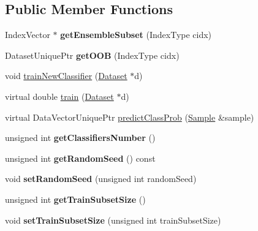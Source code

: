 \subsection*{Public Member Functions}
\begin{DoxyCompactItemize}
\item 
\hypertarget{classffactory_1_1_bagging_classifier_ac8efae7493fe5fa73188c3104100faa7}{Index\-Vector $\ast$ {\bfseries get\-Ensemble\-Subset} (Index\-Type cidx)}\label{classffactory_1_1_bagging_classifier_ac8efae7493fe5fa73188c3104100faa7}

\item 
\hypertarget{classffactory_1_1_bagging_classifier_ac237abc196fba89c3e84b608957533dc}{Dataset\-Unique\-Ptr {\bfseries get\-O\-O\-B} (Index\-Type cidx)}\label{classffactory_1_1_bagging_classifier_ac237abc196fba89c3e84b608957533dc}

\item 
void \hyperlink{classffactory_1_1_bagging_classifier_ad5a99acbc8c7760ee7757317981b3c50}{train\-New\-Classifier} (\hyperlink{classffactory_1_1_dataset}{Dataset} $\ast$d)
\item 
virtual double \hyperlink{classffactory_1_1_bagging_classifier_ac99041bbde5f875cee90fcd7075c1f60}{train} (\hyperlink{classffactory_1_1_dataset}{Dataset} $\ast$d)
\item 
virtual Data\-Vector\-Unique\-Ptr \hyperlink{classffactory_1_1_bagging_classifier_ac6361c440269860eb1f7d4ff3d9ef4e3}{predict\-Class\-Prob} (\hyperlink{classffactory_1_1_sample}{Sample} \&sample)
\item 
\hypertarget{classffactory_1_1_bagging_classifier_afb7b8b7e668e366ab83bec48bf6ddbf7}{unsigned int {\bfseries get\-Classifiers\-Number} ()}\label{classffactory_1_1_bagging_classifier_afb7b8b7e668e366ab83bec48bf6ddbf7}

\item 
\hypertarget{classffactory_1_1_bagging_classifier_a91bfb18290a1a0f761fee9b237ed25ee}{unsigned int {\bfseries get\-Random\-Seed} () const }\label{classffactory_1_1_bagging_classifier_a91bfb18290a1a0f761fee9b237ed25ee}

\item 
\hypertarget{classffactory_1_1_bagging_classifier_a5f3fb156115904b433c397f76b15f02e}{void {\bfseries set\-Random\-Seed} (unsigned int random\-Seed)}\label{classffactory_1_1_bagging_classifier_a5f3fb156115904b433c397f76b15f02e}

\item 
\hypertarget{classffactory_1_1_bagging_classifier_a6e4505eaad83937f9e4b77ff5c6be302}{unsigned int {\bfseries get\-Train\-Subset\-Size} ()}\label{classffactory_1_1_bagging_classifier_a6e4505eaad83937f9e4b77ff5c6be302}

\item 
\hypertarget{classffactory_1_1_bagging_classifier_a9bf32f51bf6a4ab658c187e0a7907ae4}{void {\bfseries set\-Train\-Subset\-Size} (unsigned int train\-Subset\-Size)}\label{classffactory_1_1_bagging_classifier_a9bf32f51bf6a4ab658c187e0a7907ae4}

\end{DoxyCompactItemize}
